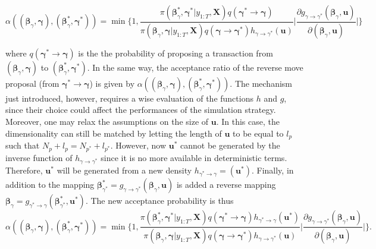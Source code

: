 \documentclass[
  12pt,
]{book}
\theoremstyle{break}
\theoremstyle{nonumberplain}
\begin{document}
\begin{equation*}\label{eq:jumpMCMC}
\alpha((\boldsymbol{\beta}_{\gamma},\boldsymbol{\gamma}),(\boldsymbol{\beta}_{\gamma}^{*},\boldsymbol{\gamma}^{*}))=\min\bigg\{1,\frac{\pi(\boldsymbol{\beta}_{\gamma}^{*},\boldsymbol{\gamma}^{*}|y_{1:T},\boldsymbol{X})q(\boldsymbol{\gamma}^{*}\to\boldsymbol{\gamma})}{\pi(\boldsymbol{\beta}_{\gamma},\boldsymbol{\gamma}|y_{1:T},\boldsymbol{X})q(\boldsymbol{\gamma} \to\boldsymbol{\gamma}^{*})h_{\gamma\to\gamma^{*}}(\boldsymbol{u})}\bigg|\frac{\partial g_{\gamma\to\gamma^{*}}(\boldsymbol{\beta}_{\gamma},\boldsymbol{u})}{\partial (\boldsymbol{\beta}_{\gamma},\boldsymbol{u})}\bigg|\bigg\}
\end{equation*}

where \(q(\boldsymbol{\gamma}^* \to \boldsymbol{\gamma})\) is the the
probability of proposing a transaction from
\((\boldsymbol{\beta}_{\gamma},\boldsymbol{\gamma})\) to
\((\boldsymbol{\beta}_{\gamma}^{*},\boldsymbol{\gamma}^{*})\). In the
same way, the acceptance ratio of the reverse move proposal (from
\(\boldsymbol{\gamma}^* \to \boldsymbol{\gamma}\)) is given by
\(\alpha((\boldsymbol{\beta}_{\gamma},\boldsymbol{\gamma}),(\boldsymbol{\beta}_{\gamma}^{*},\boldsymbol{\gamma}^{*}))\).
The mechanism just introduced, however, requires a wise evaluation of
the functions \(h\) and \(g\), since their choice could affect the
performances of the simulation strategy.\\
Moreover, one may relax the assumptions on the size of
\(\boldsymbol{u}\). In this case, the dimensionality can still be
matched by letting the length of \(\boldsymbol{u}\) to be equal to
\(l_{p}\) such that \(N_{p}+l_{p}=N_{p^*}+l_{p^*}\). However, now
\(\boldsymbol{u}^{*}\) cannot be generated by the inverse function of
\(h_{\gamma \to \gamma^*}\) since it is no more available in
deterministic terms. Therefore, \(\boldsymbol{u}^*\) will be generated
from a new density \(h_{\gamma^* \to \gamma}=(\boldsymbol{u}^*)\).
Finally, in addition to the mapping
\(\boldsymbol{\beta}^{*}_{\gamma^{*}}=g_{\gamma \to \gamma^*}(\boldsymbol{\beta}_{\gamma},\boldsymbol{u})\)
is added a reverse mapping
\(\boldsymbol{\beta}_{\gamma}=g_{\gamma^*\to\gamma}(\boldsymbol{\beta}^{*}_{\gamma^*},\boldsymbol{u}^*)\).
The new acceptance probability is thus
\begin{equation*}\label{eq:jumpMCMC1}
\alpha((\boldsymbol{\beta}_{\gamma},\boldsymbol{\gamma}),(\boldsymbol{\beta}_{\gamma}^{*},\boldsymbol{\gamma}^{*}))=\min\bigg\{1,\frac{\pi(\boldsymbol{\beta}_{\gamma}^{*},\boldsymbol{\gamma}^{*}|y_{1:T},\boldsymbol{X})q(\boldsymbol{\gamma}^{*}\to\boldsymbol{\gamma})h_{\gamma^{*}\to\gamma}(\boldsymbol{u^*})}{\pi(\boldsymbol{\beta}_{\gamma},\boldsymbol{\gamma}|y_{1:T},\boldsymbol{X})q(\boldsymbol{\gamma} \to\boldsymbol{\gamma}^{*})h_{\gamma\to\gamma^{*}}(\boldsymbol{u})}\bigg|\frac{\partial g_{\gamma\to\gamma^{*}}(\boldsymbol{\beta}_{\gamma},\boldsymbol{u})}{\partial (\boldsymbol{\beta}_{\gamma},\boldsymbol{u})}\bigg|\bigg\}.
\end{equation*}
\end{document}

